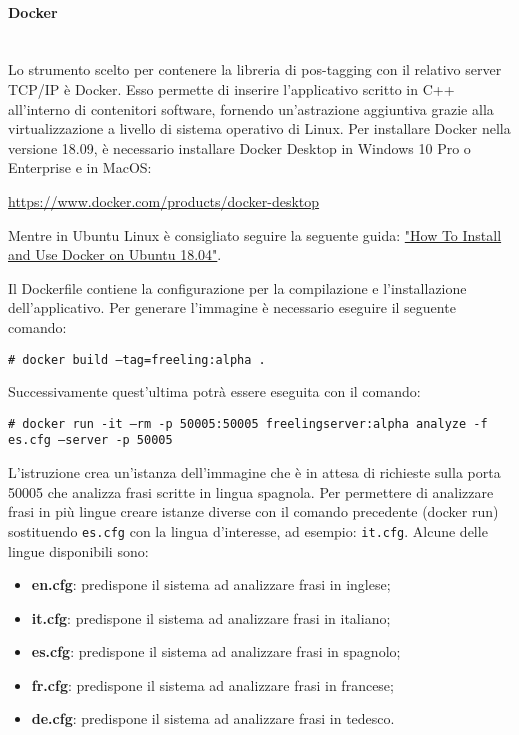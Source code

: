 \paragraph{Docker}\mbox{}\\
Lo strumento scelto per contenere la libreria di pos-tagging con il relativo server {TCP/IP} è Docker. Esso permette di inserire l'applicativo scritto in {C++} all'interno di contenitori software, fornendo un'astrazione aggiuntiva grazie alla virtualizzazione a livello di sistema operativo di Linux.
Per installare Docker nella versione 18.09, è necessario installare Docker Desktop in Windows 10 Pro o Enterprise e in MacOS:
\begin{center}
\url{https://www.docker.com/products/docker-desktop}
\end{center}
Mentre in Ubuntu Linux è consigliato seguire la seguente guida: \href{https://www.digitalocean.com/community/tutorials/how-to-install-and-use-docker-on-ubuntu-18-04}{"How To Install and Use Docker on Ubuntu 18.04"}.
\begin{flushleft}
	\url{}
\end{flushleft}
Il Dockerfile contiene la configurazione per la compilazione e l'installazione dell'applicativo. 
Per generare l'immagine è necessario eseguire il seguente comando:
\begin{center}
	\texttt{\# docker build --tag=freeling:alpha .}
\end{center}
Successivamente quest'ultima potrà essere eseguita con il comando:	
\begin{center}
	\texttt{\# docker run -it --rm -p 50005:50005 freelingserver:alpha analyze -f es.cfg --server -p 50005}
\end{center}
L'istruzione crea un'istanza dell'immagine che è in attesa di richieste sulla porta 50005 che analizza frasi scritte in lingua spagnola.
Per permettere di analizzare frasi in più lingue creare istanze diverse con il comando precedente (docker run) sostituendo \texttt{es.cfg} con la lingua d'interesse, ad esempio: \texttt{it.cfg}. Alcune delle lingue disponibili sono: 
\begin{itemize}
	\item \textbf{en.cfg}: predispone il sistema ad analizzare frasi in inglese;
	\item \textbf{it.cfg}: predispone il sistema ad analizzare frasi in italiano;
	\item \textbf{es.cfg}: predispone il sistema ad analizzare frasi in spagnolo;
	\item \textbf{fr.cfg}: predispone il sistema ad analizzare frasi in francese;
	\item \textbf{de.cfg}: predispone il sistema ad
	analizzare frasi in tedesco.
\end{itemize}


